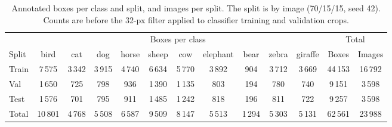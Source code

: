 \begin{table}[H]
\centering
\caption{Annotated boxes per class and split, and images per split. The split is by image (70/15/15, seed 42). Counts are before the 32-px filter applied to classifier training and validation crops.}
\label{tab:dataset}
\footnotesize
\setlength{\tabcolsep}{4pt}
\begin{tabular}{lcccccccccccc}
\toprule
 & \multicolumn{10}{c}{Boxes per class} & \multicolumn{2}{c}{Total} \\
\cmidrule(lr){2-11}\cmidrule(lr){12-13}
Split & bird & cat & dog & horse & sheep & cow & elephant & bear & zebra & giraffe & Boxes & Images \\
\midrule
Train & \phantom{0}7\,575 & 3\,342 & 3\,915 & 4\,740 & 6\,634 & 5\,770 & 3\,892 & \phantom{0\,}904 & 3\,712 & 3\,669 & 44\,153 & 16\,792 \\
Val & \phantom{0}1\,650 & \phantom{0\,}725 & \phantom{0\,}798 & \phantom{0\,}936 & 1\,390 & 1\,135 & \phantom{0\,}803 & \phantom{0\,}194 & \phantom{0\,}780 & \phantom{0\,}740 & \phantom{0}9\,151 & \phantom{0}3\,598 \\
Test & \phantom{0}1\,576 & \phantom{0\,}701 & \phantom{0\,}795 & \phantom{0\,}911 & 1\,485 & 1\,242 & \phantom{0\,}818 & \phantom{0\,}196 & \phantom{0\,}811 & \phantom{0\,}722 & \phantom{0}9\,257 & \phantom{0}3\,598 \\
\midrule
Total & 10\,801 & 4\,768 & 5\,508 & 6\,587 & 9\,509 & 8\,147 & 5\,513 & 1\,294 & 5\,303 & 5\,131 & 62\,561 & 23\,988 \\
\bottomrule
\end{tabular}
\end{table}
